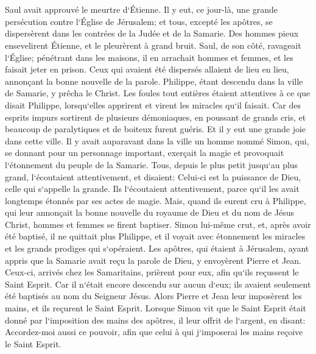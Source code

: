 \chapter{}

\verse Saul avait approuvé le meurtre d`Étienne. Il y eut, ce jour-là, une grande persécution contre l`Église de Jérusalem; et tous, excepté les apôtres, se dispersèrent dans les contrées de la Judée et de la Samarie. 
\verse Des hommes pieux ensevelirent Étienne, et le pleurèrent à grand bruit. 
\verse Saul, de son côté, ravageait l`Église; pénétrant dans les maisons, il en arrachait hommes et femmes, et les faisait jeter en prison. 
\verse Ceux qui avaient été dispersés allaient de lieu en lieu, annonçant la bonne nouvelle de la parole. 
\verse Philippe, étant descendu dans la ville de Samarie, y prêcha le Christ. 
\verse Les foules tout entières étaient attentives à ce que disait Philippe, lorsqu`elles apprirent et virent les miracles qu`il faisait. 
\verse Car des esprits impurs sortirent de plusieurs démoniaques, en poussant de grands cris, et beaucoup de paralytiques et de boiteux furent guéris. 
\verse Et il y eut une grande joie dans cette ville. 
\verse Il y avait auparavant dans la ville un homme nommé Simon, qui, se donnant pour un personnage important, exerçait la magie et provoquait l`étonnement du peuple de la Samarie. 
\verse Tous, depuis le plus petit jusqu`au plus grand, l`écoutaient attentivement, et disaient: Celui-ci est la puissance de Dieu, celle qui s`appelle la grande. 
\verse Ils l`écoutaient attentivement, parce qu`il les avait longtemps étonnés par ses actes de magie. 
\verse Mais, quand ils eurent cru à Philippe, qui leur annonçait la bonne nouvelle du royaume de Dieu et du nom de Jésus Christ, hommes et femmes se firent baptiser. 
\verse Simon lui-même crut, et, après avoir été baptisé, il ne quittait plus Philippe, et il voyait avec étonnement les miracles et les grands prodiges qui s`opéraient. 
\verse Les apôtres, qui étaient à Jérusalem, ayant appris que la Samarie avait reçu la parole de Dieu, y envoyèrent Pierre et Jean. 
\verse Ceux-ci, arrivés chez les Samaritains, prièrent pour eux, afin qu`ils reçussent le Saint Esprit. 
\verse Car il n`était encore descendu sur aucun d`eux; ils avaient seulement été baptisés au nom du Seigneur Jésus. 
\verse Alors Pierre et Jean leur imposèrent les mains, et ils reçurent le Saint Esprit. 
\verse Lorsque Simon vit que le Saint Esprit était donné par l`imposition des mains des apôtres, il leur offrit de l`argent, 
\verse en disant: Accordez-moi aussi ce pouvoir, afin que celui à qui j`imposerai les mains reçoive le Saint Esprit. 
